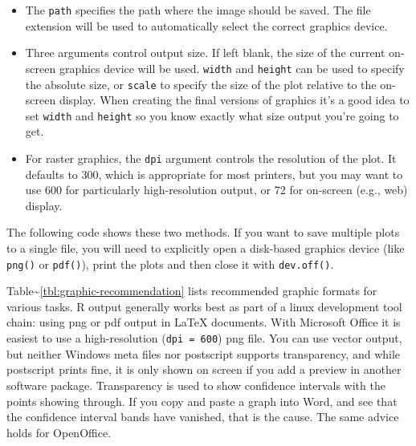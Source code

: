 \begin{itemize}
\itemsep1pt\parskip0pt
\item
  The \texttt{path} specifies the path where the image should be saved.
  The file extension will be used to automatically select the correct
  graphics device.
\item
  Three arguments control output size. If left blank, the size of the
  current on-screen graphics device will be used. \texttt{width} and
  \texttt{height} can be used to specify the absolute size, or
  \texttt{scale} to specify the size of the plot relative to the
  on-screen display. When creating the final versions of graphics it's a
  good idea to set \texttt{width} and \texttt{height} so you know
  exactly what size output you're going to get.
\item
  For raster graphics, the \texttt{dpi} argument controls the resolution
  of the plot. It defaults to 300, which is appropriate for most
  printers, but you may want to use 600 for particularly high-resolution
  output, or 72 for on-screen (e.g., web) display.
\end{itemize}

The following code shows these two methods. If you want to save multiple
plots to a single file, you will need to explicitly open a disk-based
graphics device (like \texttt{png()} or \texttt{pdf()}), print the plots
and then close it with \texttt{dev.off()}.

\begin{Shaded}
\begin{Highlighting}[]
 
\NormalTok{(} \NormalTok{)}

\NormalTok{(} \NormalTok{, } \NormalTok{, } \NormalTok{)}
 
 
\NormalTok{()}
\end{Highlighting}
\end{Shaded}

Table\textasciitilde{}\ref{tbl:graphic-recommendation} lists recommended
graphic formats for various tasks. R output generally works best as part
of a linux development tool chain: using png or pdf output in LaTeX
documents. With Microsoft Office it is easiest to use a high-resolution
(\texttt{dpi = 600}) png file. You can use vector output, but neither
Windows meta files nor postscript supports transparency, and while
postscript prints fine, it is only shown on screen if you add a preview
in another software package. Transparency is used to show confidence
intervals with the points showing through. If you copy and paste a graph
into Word, and see that the confidence interval bands have vanished,
that is the cause. The same advice holds for OpenOffice.
 

